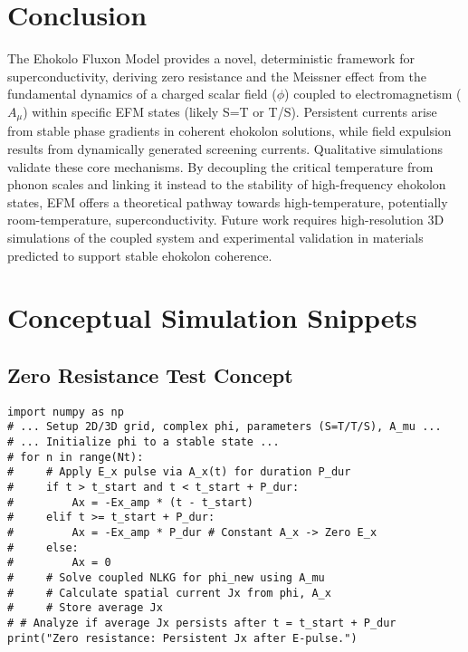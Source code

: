\documentclass[11pt]{article}
\begin{document}
\section{Conclusion}
The Ehokolo Fluxon Model provides a novel, deterministic framework for superconductivity, deriving zero resistance and the Meissner effect from the fundamental dynamics of a charged scalar field (\(\phi\)) coupled to electromagnetism (\(A_\mu\)) within specific EFM states (likely S=T or T/S). Persistent currents arise from stable phase gradients in coherent ehokolon solutions, while field expulsion results from dynamically generated screening currents. Qualitative simulations validate these core mechanisms. By decoupling the critical temperature from phonon scales and linking it instead to the stability of high-frequency ehokolon states, EFM offers a theoretical pathway towards high-temperature, potentially room-temperature, superconductivity. Future work requires high-resolution 3D simulations of the coupled system and experimental validation in materials predicted to support stable ehokolon coherence.

\appendix
\section{Conceptual Simulation Snippets}

\subsection{Zero Resistance Test Concept}
\begin{lstlisting}
import numpy as np
# ... Setup 2D/3D grid, complex phi, parameters (S=T/T/S), A_mu ...
# ... Initialize phi to a stable state ...
# for n in range(Nt):
#     # Apply E_x pulse via A_x(t) for duration P_dur
#     if t > t_start and t < t_start + P_dur:
#         Ax = -Ex_amp * (t - t_start)
#     elif t >= t_start + P_dur:
#         Ax = -Ex_amp * P_dur # Constant A_x -> Zero E_x
#     else:
#         Ax = 0
#     # Solve coupled NLKG for phi_new using A_mu
#     # Calculate spatial current Jx from phi, A_x
#     # Store average Jx
# # Analyze if average Jx persists after t = t_start + P_dur
print("Zero resistance: Persistent Jx after E-pulse.")
\end{lstlisting}
\end{document}
